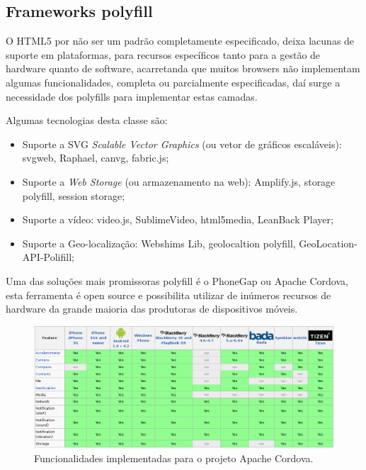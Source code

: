 \documentclass{article}
\begin{document}
\subsection{Frameworks polyfill}

O HTML5 por não ser um padrão completamente especificado, deixa lacunas de suporte em plataformas, para recursos específicos tanto para a gestão de hardware quanto de software, acarretanda que muitos browsers não implementam algumas funcionalidades, completa ou parcialmente especificadas, daí surge a necessidade dos polyfills para implementar estas camadas.

Algumas tecnologias desta classe são:

\begin{itemize}
\item Suporte a SVG \textit{Scalable Vector Graphics} (ou vetor de gráficos escaláveis): svgweb, Raphael, canvg, fabric.js;
\item Suporte a \textit{Web Storage} (ou armazenamento na web): Amplify.js, storage polyfill, session storage;
\item Suporte a vídeo: video.js, SublimeVideo, html5media, LeanBack Player;
\item Suporte a Geo-localização: Webshims Lib, geolocaltion polyfill, GeoLocation-API-Polifill;
\end{itemize}

Uma das soluções mais promissoras polyfill é o PhoneGap ou Apache Cordova, esta ferramenta é open source e possibilita utilizar de inúmeros recursos de hardware da grande maioria das produtoras de dispositivos móveis.

\begin{figure}[!htbp]
    \begin{center}
        \includegraphics[width=\textwidth]{asset/img/cordovaFeatures.jpg}
               \caption{Funcionalidades implementadas para o projeto Apache Cordova.\label{fig:Cordova}}
    \end{center}
\end{figure}
\end{document}
